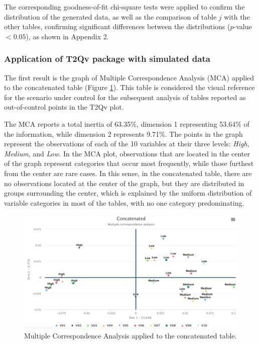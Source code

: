 \documentclass[mathematics,article,submit,moreauthors,pdftex]{mdpi}
\begin{document}
The corresponding goodness-of-fit chi-square tests were applied to
confirm the distribution of the generated data, as well as the
comparison of table \(j\) with the other tables, confirming significant
differences between the distributions (\(p\)-value \(< 0.05\)), as shown
in Appendix 2.

\hypertarget{application-of-t2qv-package-with-simulated-data}{%
\subsubsection{Application of T2Qv package with simulated
data}\label{application-of-t2qv-package-with-simulated-data}}

The first result is the graph of Multiple Correspondence Analysis (MCA)
applied to the concatenated table (Figure \ref{fig:concatenatedfig}).
This table is considered the visual reference for the scenario under
control for the subsequent analysis of tables reported as out-of-control
points in the T2Qv plot.

The MCA reports a total inertia of 63.35\%, dimension 1 representing
53.64\% of the information, while dimension 2 represents 9.71\%. The
points in the graph represent the observations of each of the 10
variables at their three levels: \emph{High}, \emph{Medium}, and
\emph{Low.} In the MCA plot, observations that are located in the center
of the graph represent categories that occur most frequently, while
those furthest from the center are rare cases. In this sense, in the
concatenated table, there are no observations located at the center of
the graph, but they are distributed in groups surrounding the center,
which is explained by the uniform distribution of variable categories in
most of the tables, with no one category predominating.

\begin{figure}[H]


\begin{center}\includegraphics[width=0.9\linewidth,]{concatenated} \end{center}

\caption{Multiple Correspondence Analysis applied to the concatenated table.}

\label{fig:concatenatedfig}
\end{figure}
\end{document}
